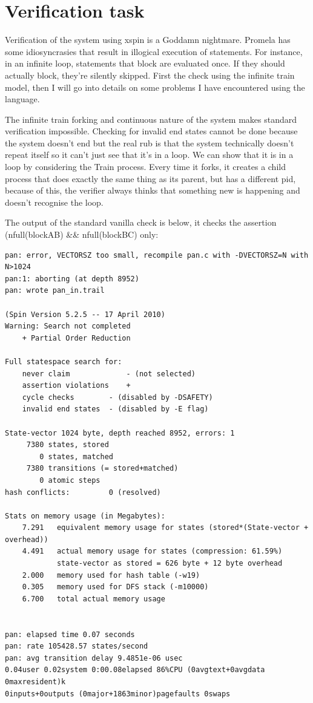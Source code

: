 \documentclass[10pt]{article}
\begin{document}
  \section{Verification task}
    Verification of the system using xspin is a Goddamn nightmare. Promela has
    some idiosyncrasies that result in illogical execution of statements.
    For instance, in an infinite loop, statements that block are evaluated 
    once. If they should actually block, they're silently skipped. First the
    check using the infinite train model, then I will go into details on some
    problems I have encountered using the language.  

    The infinite train forking and continuous nature of the system makes
    standard verification impossible. Checking for invalid end states cannot
    be done because the system doesn't end but the real rub is that the system
    technically doesn't repeat itself so it can't just see that it's in a loop.
    We can show that it is in a loop by considering the Train process. Every 
    time it forks, it creates a child process that does exactly the same thing
    as its parent, but has a different pid, because of this, the verifier always
    thinks that something new is happening and doesn't recognise the loop.
    
    The output of the standard vanilla check is below, it checks the assertion
    (nfull(blockAB) \&\& nfull(blockBC) only:

    \begin{verbatim}
pan: error, VECTORSZ too small, recompile pan.c with -DVECTORSZ=N with N>1024
pan:1: aborting (at depth 8952)
pan: wrote pan_in.trail

(Spin Version 5.2.5 -- 17 April 2010)
Warning: Search not completed
	+ Partial Order Reduction

Full statespace search for:
	never claim         	- (not selected)
	assertion violations	+
	cycle checks       	- (disabled by -DSAFETY)
	invalid end states	- (disabled by -E flag)

State-vector 1024 byte, depth reached 8952, errors: 1
     7380 states, stored
        0 states, matched
     7380 transitions (= stored+matched)
        0 atomic steps
hash conflicts:         0 (resolved)

Stats on memory usage (in Megabytes):
    7.291	equivalent memory usage for states (stored*(State-vector + overhead))
    4.491	actual memory usage for states (compression: 61.59%)
         	state-vector as stored = 626 byte + 12 byte overhead
    2.000	memory used for hash table (-w19)
    0.305	memory used for DFS stack (-m10000)
    6.700	total actual memory usage


pan: elapsed time 0.07 seconds
pan: rate 105428.57 states/second
pan: avg transition delay 9.4851e-06 usec
0.04user 0.02system 0:00.08elapsed 86%CPU (0avgtext+0avgdata 0maxresident)k
0inputs+0outputs (0major+1863minor)pagefaults 0swaps


    \end{verbatim}
\end{document}
